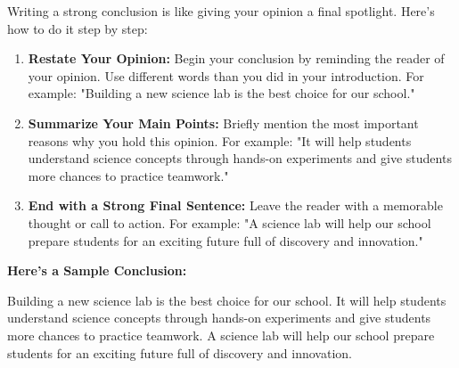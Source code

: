 \documentclass[12pt]{article}
\begin{document}
\begin{tcolorbox}[colframe=black!60, colback=white, 
coltitle=black, colbacktitle=black!15, fonttitle=\bfseries\Large, 
title=Example: How to Write a Conclusion, halign title=center, left=10pt, right=10pt, top=10pt, bottom=15pt]
Writing a strong conclusion is like giving your opinion a final spotlight. Here’s how to do it step by step:

\begin{enumerate}
    \item \textbf{Restate Your Opinion:} Begin your conclusion by reminding the reader of your opinion. Use different words than you did in your introduction. For example: "Building a new science lab is the best choice for our school."
    \item \textbf{Summarize Your Main Points:} Briefly mention the most important reasons why you hold this opinion. For example: "It will help students understand science concepts through hands-on experiments and give students more chances to practice teamwork."
    \item \textbf{End with a Strong Final Sentence:} Leave the reader with a memorable thought or call to action. For example: "A science lab will help our school prepare students for an exciting future full of discovery and innovation."
\end{enumerate}

\textbf{Here’s a Sample Conclusion:}

Building a new science lab is the best choice for our school. It will help students understand science concepts through hands-on experiments and give students more chances to practice teamwork. A science lab will help our school prepare students for an exciting future full of discovery and innovation.
\end{tcolorbox}

\vspace{1em}
\end{document}
